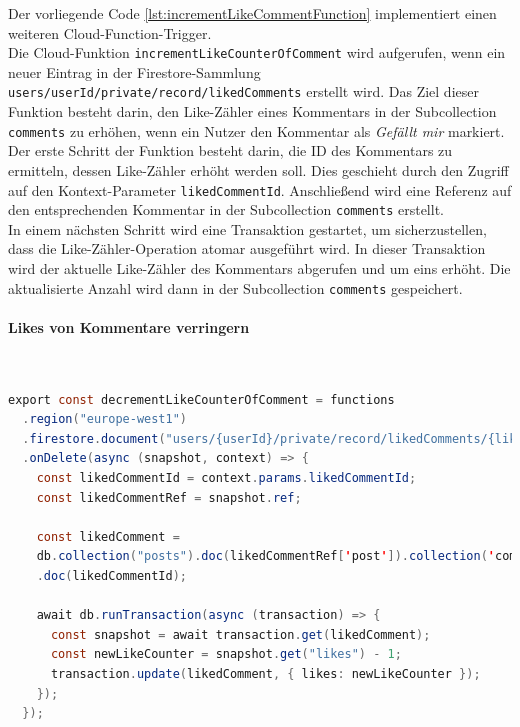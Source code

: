 Der vorliegende Code \ref{lst:incrementLikeCommentFunction} implementiert einen weiteren Cloud-Function-Trigger.
\\
Die Cloud-Funktion \texttt{incrementLikeCounterOfComment} wird aufgerufen, wenn ein neuer Eintrag in der Firestore-Sammlung \texttt{users/{userId}/private/record/likedComments} erstellt wird. Das Ziel dieser Funktion besteht darin, den Like-Zähler eines Kommentars in der Subcollection \texttt{comments} zu erhöhen, wenn ein Nutzer den Kommentar als \textit{Gefällt mir} markiert.
\\
Der erste Schritt der Funktion besteht darin, die ID des Kommentars zu ermitteln, dessen Like-Zähler erhöht werden soll. Dies geschieht durch den Zugriff auf den Kontext-Parameter \texttt{likedCommentId}. Anschließend wird eine Referenz auf den entsprechenden Kommentar in der Subcollection \texttt{comments} erstellt.
\\
In einem nächsten Schritt wird eine Transaktion gestartet, um sicherzustellen, dass die Like-Zähler-Operation atomar ausgeführt wird. In dieser Transaktion wird der aktuelle Like-Zähler des Kommentars abgerufen und um eins erhöht. Die aktualisierte Anzahl wird dann in der Subcollection \texttt{comments} gespeichert.

\paragraph{Likes von Kommentare verringern}\mbox{} \\

\begin{lstlisting}[language=Java,caption=decrementLikeCounterOfComment Funktion,label=lst:decrementLikeCommentFunction]
  export const decrementLikeCounterOfComment = functions
  .region("europe-west1")
  .firestore.document("users/{userId}/private/record/likedComments/{likedCommentId}")
  .onDelete(async (snapshot, context) => {
    const likedCommentId = context.params.likedCommentId;
    const likedCommentRef = snapshot.ref;

    const likedComment =
    db.collection("posts").doc(likedCommentRef['post']).collection('comments')
    .doc(likedCommentId);

    await db.runTransaction(async (transaction) => {
      const snapshot = await transaction.get(likedComment);
      const newLikeCounter = snapshot.get("likes") - 1;
      transaction.update(likedComment, { likes: newLikeCounter });
    });
  });
\end{lstlisting}

